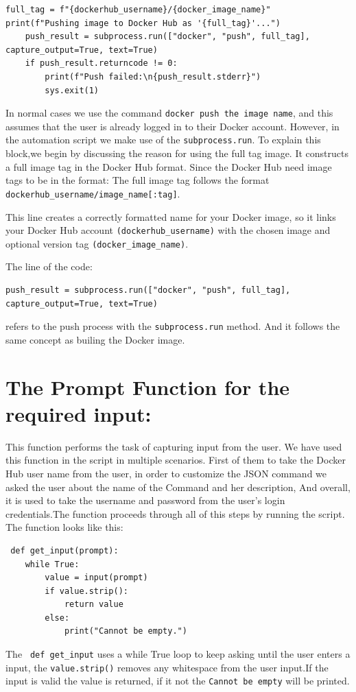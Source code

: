 \begin{lstlisting}
full_tag = f"{dockerhub_username}/{docker_image_name}"
print(f"Pushing image to Docker Hub as '{full_tag}'...")
    push_result = subprocess.run(["docker", "push", full_tag], capture_output=True, text=True)
    if push_result.returncode != 0:
        print(f"Push failed:\n{push_result.stderr}")
        sys.exit(1)

\end{lstlisting}

In normal cases we use the command \texttt{docker push the image name}, and this assumes that the user is already logged in to their Docker account. However, in the automation script we make use of the \texttt{subprocess.run}. 
To explain this block,we begin by discussing the reason for using the full tag image. It constructs a full image tag in the Docker Hub format. Since the Docker Hub need image tags  to be in the format: The full image tag follows the format \texttt{dockerhub\_username/image\_name[:tag]}.

This line creates a correctly formatted name for your Docker image, so it links your Docker Hub account \texttt{(dockerhub\_username)} with the chosen image and optional version tag \texttt{(docker\_image\_name)}.

The line of the code: 
\begin{lstlisting}
push_result = subprocess.run(["docker", "push", full_tag], capture_output=True, text=True)
\end{lstlisting}
refers to the push process with the \texttt{subprocess.run} method. And it follows the same concept as builing the Docker image. 

\section{The Prompt Function for the required input:}

 This function performs the task of capturing input from the user.
 We have used this function in the script in multiple scenarios. First of them to take the Docker Hub user name from the user, in order to customize the JSON command we asked the user about the name of the Command and her description, And overall, it is used to take the username and password from the user's login credentials.The function proceeds through all of this steps by running the script.
 The function looks like this:
 
 \begin{lstlisting}
 def get_input(prompt):
    while True:
        value = input(prompt)
        if value.strip():
            return value
        else:
            print("Cannot be empty.")

\end{lstlisting}
The \texttt{ def get\_input} uses a while True loop to keep asking until the user enters a input, the \texttt{value.strip()} removes any whitespace from the user input.If the input is valid the value is returned, if it not the \texttt{Cannot be empty} will be printed.


